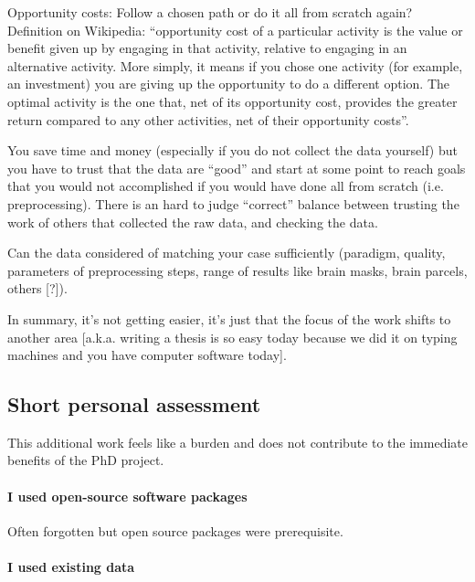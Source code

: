 Opportunity costs: Follow a chosen path or do it all from scratch again?
%
Definition on Wikipedia: ``opportunity cost of a particular activity is the
value or benefit given up by engaging in that activity, relative to engaging in
an alternative activity.
%
More simply, it means if you chose one activity (for example, an investment) you
are giving up the opportunity to do a different option.
%
The optimal activity is the one that, net of its opportunity cost, provides the
greater return compared to any other activities, net of their opportunity
costs''.

You save time and money (especially if you do not collect the data yourself) but
you have to trust that the data are ``good'' and start at some point to reach
goals that you would not accomplished if you would have done all from scratch
(i.e. preprocessing).
%
There is an hard to judge ``correct'' balance between trusting the work of
others that collected the raw data, and checking the data.

Can the data considered of matching your case sufficiently (paradigm, quality,
parameters of preprocessing steps, range of results like brain masks, brain
parcels, others [?]).

%
In summary, it's not getting easier, it's just that the focus of the work shifts
to another area [a.k.a. writing a thesis is so easy today because we did it on
typing machines and you have computer software today].


\subsection{Short personal assessment}


%
This additional work feels like a burden and does not contribute to the
immediate benefits of the PhD project.

\paragraph{I used open-source software packages}

Often forgotten but open source packages were prerequisite.


\paragraph{I used existing data}

